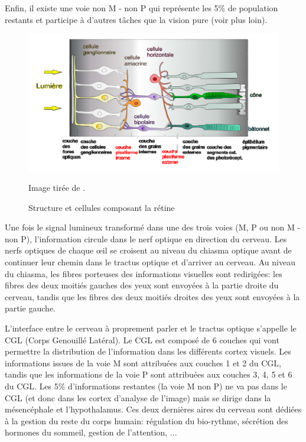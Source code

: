 	\par Enfin, il existe une voie non M - non P qui représente les 5\% de population restants et participe à d'autres tâches que la vision pure (voir plus loin). 
	
	\begin{figure}[h]
		\centering
		\includegraphics[scale=.45]{Figures/StructureRetinae}
		\caption{Structure et cellules composant la rétine}{Image tirée de  \citep{anses_effets_2014}.}
		\label{fig:structure_retine}
	\end{figure}
	
	\par Une fois le signal lumineux transformé dans une des trois voies (M, P ou non M - non P), l'information circule dans le nerf optique en direction du cerveau. Les nerfs optiques de chaque œil se croisent au niveau du chiasma optique avant de continuer leur chemin dans le tractus optique et d'arriver au cerveau. Au niveau du chiasma, les fibres porteuses des informations visuelles sont redirigées: les fibres des deux moitiés gauches des yeux sont envoyées à la partie droite du cerveau, tandis que les fibres des deux moitiés droites des yeux sont envoyées à la partie gauche.
	
	\par L'interface entre le cerveau à proprement parler et le tractus optique s'appelle le CGL (Corps Genouillé Latéral). Le CGL est composé de 6 couches qui vont permettre la distribution de l'information dans les différents cortex visuels. Les informations issues de la voie M sont attribuées aux couches 1 et 2 du CGL, tandis que les informations de la voie P sont attribuées aux couches 3, 4, 5 et 6 du CGL. Les 5\% d'informations restantes (la voie M non P) ne va pas dans le CGL (et donc dans les cortex d'analyse de l'image) mais se dirige dans la mésencéphale et l'hypothalamus. Ces deux dernières aires du cerveau sont dédiées à la gestion du reste du corps humain: régulation du bio-rythme, sécrétion des hormones du sommeil, gestion de l'attention, ...
	
